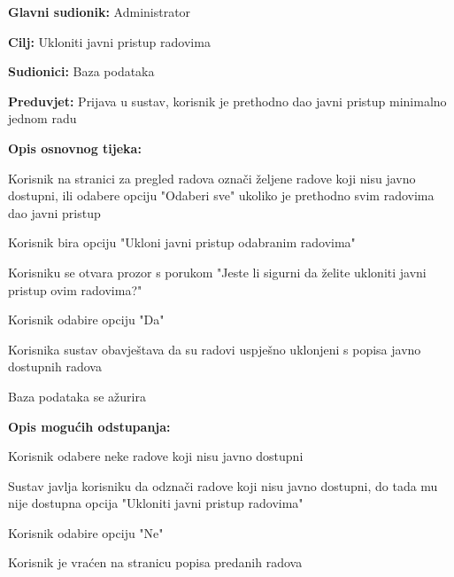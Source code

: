 					\noindent {}
					\begin{packed_item}
						\item \textbf{Glavni sudionik:} Administrator
						\item \textbf{Cilj:} Ukloniti javni pristup radovima
						\item \textbf{Sudionici:} Baza podataka
						\item \textbf{Preduvjet:} Prijava u sustav, korisnik je prethodno dao javni pristup minimalno jednom radu
						
						\item \textbf{Opis osnovnog tijeka:} 
						\item[] \begin{packed_enum}
							\item Korisnik na stranici za pregled radova označi željene radove koji nisu javno dostupni, ili odabere opciju "Odaberi sve" ukoliko je prethodno svim radovima dao javni pristup
							\item Korisnik bira opciju "Ukloni javni pristup odabranim radovima"
							\item Korisniku se otvara prozor s porukom "Jeste li sigurni da želite ukloniti javni pristup ovim radovima?"
							\item Korisnik odabire opciju "Da"
							\item Korisnika sustav obavještava da su radovi uspješno uklonjeni s popisa javno dostupnih radova
							\item Baza podataka se ažurira
						\end{packed_enum}
					
						\item \textbf{Opis mogućih odstupanja:}
						\item[] \begin{packed_enum}
							\item[1.a] Korisnik odabere neke radove koji nisu javno dostupni
							\item[] \begin{packed_enum}
								\item[1.] Sustav javlja korisniku da odznači radove koji nisu javno dostupni, do tada mu nije dostupna opcija "Ukloniti javni pristup radovima"

							\end{packed_enum}
							\item[4.a] Korisnik odabire opciju "Ne"
							\item[] \begin{packed_enum}
								\item[1.] Korisnik je vraćen na stranicu popisa predanih radova
							\end{packed_enum} 
						\end{packed_enum}
					\end{packed_item}

